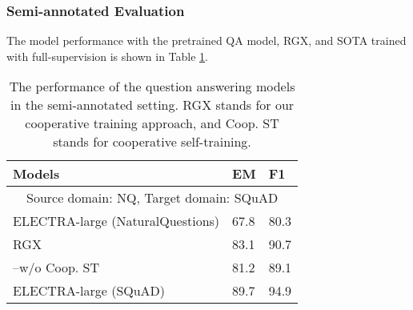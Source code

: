 \documentclass[11pt,a4paper]{article}
\begin{document}
\subsubsection{Semi-annotated Evaluation}
The model performance with the pretrained QA model, RGX, and SOTA trained with full-supervision is shown in Table \ref{tab:semi}.

\begin{table}[h]
\small
\centering
\begin{tabular}{@{}lll@{}}
\toprule
\textbf{Models}             & \textbf{EM}   & \textbf{F1}   \\ \midrule
\multicolumn{3}{c}{Source domain: NQ, Target domain: SQuAD}      \\ \hdashline[1.5pt/2pt]
ELECTRA-large (NaturalQuestions)    & 67.8 & 80.3 \\
RGX  & 83.1 & 90.7 \\
--w/o Coop. ST    & 81.2 & 89.1 \\
ELECTRA-large (SQuAD)     & 89.7 & 94.9 \\ \bottomrule
\end{tabular}
\caption{The performance of the question answering models in the semi-annotated setting. RGX stands for our cooperative training approach, and Coop. ST stands for cooperative self-training.}
\label{tab:semi}
\end{table}
\end{document}

